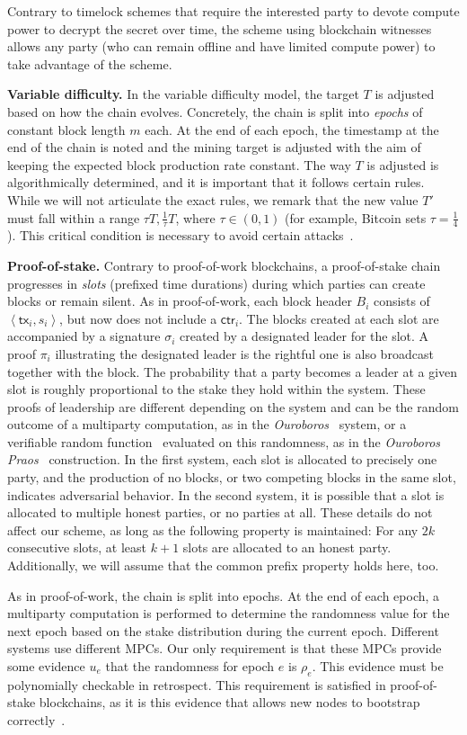 Contrary to timelock schemes that require the interested party to devote compute power to decrypt the secret
over time, the scheme using blockchain witnesses allows any party (who can remain offline and have limited compute
power) to take advantage of the scheme.

\noindent
\textbf{Variable difficulty.}
In the variable difficulty model, the target $T$ is adjusted based on how the chain evolves.
Concretely, the chain is split into \emph{epochs} of constant block length $m$ each. At the end of each
epoch, the timestamp at the end of the chain is noted and the mining target is adjusted with the
aim of keeping the expected block production rate constant.
The
way $T$ is adjusted is algorithmically determined, and it is important that it follows certain
rules. While we will not articulate the exact rules, we remark that the new value $T'$ must fall
within a range $\tau T, \frac{1}{\tau} T$, where $\tau \in (0, 1)$ (for example, Bitcoin sets
$\tau = \frac{1}{4}$). This critical condition is necessary to avoid certain attacks~\cite{bahack}.

\noindent
\textbf{Proof-of-stake.}
Contrary to proof-of-work blockchains, a proof-of-stake chain progresses in \emph{slots}
(prefixed time durations) during which
parties can create blocks or remain silent.
As in proof-of-work, each block header $B_i$ consists of $\left<\textsf{tx}_i, s_i\right>$, but now
does not include a $\textsf{ctr}_i$.
The blocks created at each slot are accompanied by a
signature $\sigma_i$ created by a designated leader for the slot.
A proof $\pi_i$ illustrating the designated leader is the rightful one
is also broadcast together with the block.
The probability that a party becomes a leader at a given slot is roughly
proportional to the stake they hold within the system.
These proofs of leadership are different depending on the system and can
be the random outcome of a multiparty computation, as in the \emph{Ouroboros}~\cite{ouroboros} system,
or a verifiable random function~\cite{FOCS:MicRabVad99} evaluated on this randomness, as in
the \emph{Ouroboros Praos}~\cite{praos} construction.
In the first system,
each slot is allocated to precisely one party, and the production of no blocks, or two competing blocks in the
same slot, indicates adversarial behavior. In the second system, it is possible that a slot is allocated
to multiple honest parties, or no parties at all. These details do not affect our scheme, as long as the following
property is maintained: For any $2k$ consecutive slots, at least $k+1$ slots are allocated to an honest
party. Additionally, we will assume that the common prefix property holds here, too.

As in proof-of-work, the chain is split into epochs.
At the end of each epoch, a multiparty computation is performed to determine
the randomness value for the next epoch based on the stake distribution during the current epoch.
Different systems use different MPCs. Our only requirement is that these MPCs provide some
evidence $u_e$ that the randomness for epoch $e$ is $\rho_e$. This evidence must be
polynomially checkable in retrospect. This requirement is satisfied in proof-of-stake blockchains,
as it is this evidence that allows new nodes to bootstrap correctly~\cite{ouroboros-genesis}.
